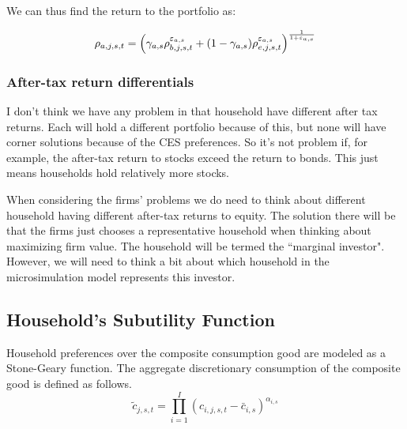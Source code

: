 We can thus find the return to the portfolio as:

\begin{equation}
\label{eqn:port_return}
\rho_{a,j,s,t} = \left(\gamma_{a,s}\rho_{b,j,s,t}^{\varepsilon_{a,s}}+(1-\gamma_{a,s})\rho_{e,j,s,t}^{\varepsilon_{a,s}}\right)^{\frac{1}{1+\varepsilon_{a,s}}}
\end{equation}     

\subsubsection{After-tax return differentials}

I don't think we have any problem in that household have different after tax returns.  Each will hold a different portfolio because of this, but none will have corner solutions because of the CES preferences.  So it's not problem if, for example, the after-tax return to stocks exceed the return to bonds.  This just means households hold relatively more stocks.  

When considering the firms' problems we do need to think about different household having different after-tax returns to equity.  The solution there will be that the firms just chooses a representative household when thinking about maximizing firm value.  The household will be termed the ``marginal investor".  However, we will need to think a bit about which household in the microsimulation model represents this investor.
       
       
    \subsection{Household's Subutility Function}\label{sec:subutil}
    
    Household preferences over the composite consumption good are modeled as a Stone-Geary function. The aggregate discretionary consumption of the composite good is defined as follows.
    \begin{equation} \label{eqn:comp_cons}
        \tilde{c}_{j,s,t}  = \prod_{i=1}^I \left( c_{i,j,s,t} - \bar c_{i,s} \right) ^{\alpha_{i,s}} 
    \end{equation}

